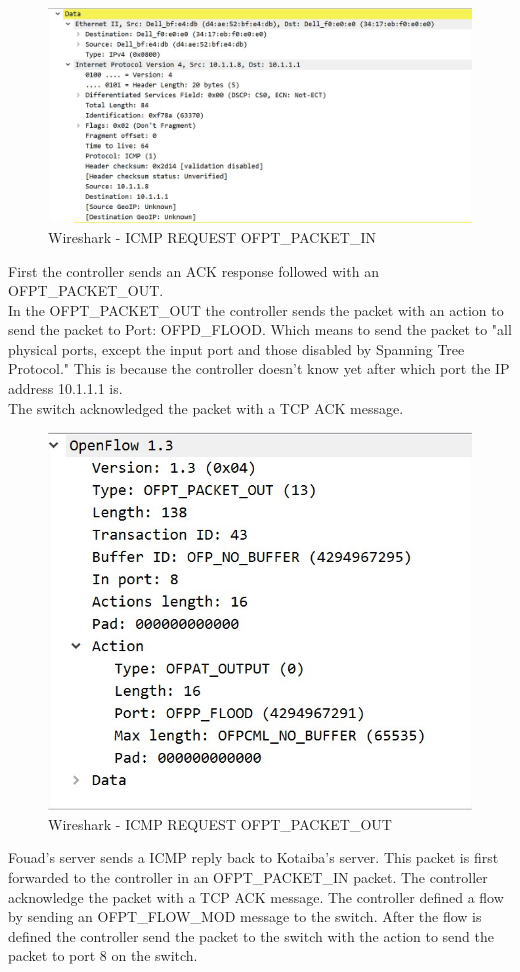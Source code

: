 \documentclass[a4paper]{article}
\begin{document}
\begin{figure}[h]
    \centering
    \includegraphics[scale=0.2]{images/ICMPREQUEST.jpg}
    \caption{Wireshark - ICMP REQUEST OFPT\_PACKET\_IN}
    \label{fig:ICMPREQUEST}
\end{figure}
\noindent
First the controller sends an ACK response followed with an OFPT\_PACKET\_OUT.  \\ In the OFPT\_PACKET\_OUT the controller sends the packet with an action to send the packet to Port: OFPD\_FLOOD. Which means to send the packet to "all physical ports, except the input port and those disabled by Spanning Tree Protocol."\cite{openflowactions} This is because the controller doesn't know yet after which port the IP address 10.1.1.1 is. \\
The switch acknowledged the packet with a TCP ACK message.\\
\begin{figure}[h]
    \centering
    \includegraphics[scale=0.2]{images/ICMPREQUEST1.jpg}
    \caption{Wireshark - ICMP REQUEST OFPT\_PACKET\_OUT}
    \label{fig:ICMPREQUEST1}
\end{figure}
\noindent
Fouad's server sends a ICMP reply back to Kotaiba's server. This packet is first forwarded to the controller in an OFPT\_PACKET\_IN packet. The controller acknowledge the packet with a TCP ACK message. The controller defined a flow by sending an OFPT\_FLOW\_MOD message to the switch. After the flow is defined the controller send the packet to the switch with the action to send the packet to port 8 on the switch. 
\end{document}
